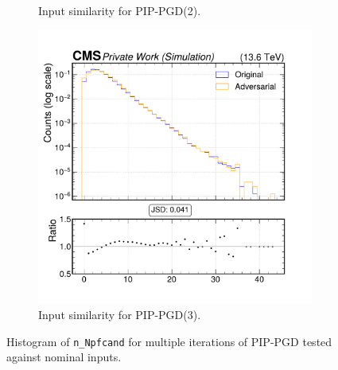 \begin{figure}[htbp]
\begin{subfigure}[t]{0.32\textwidth}
    \caption*{Input similarity for PIP-PGD(2).}
  \end{subfigure}\hfill
  \begin{subfigure}[t]{0.32\textwidth}
    \includegraphics[width=\linewidth]{media/output/features/compare/combined_it_3/cmp_global_features_n_Npfcand.pdf}
    \caption*{Input similarity for PIP-PGD(3).}
  \end{subfigure}

  \caption*{Histogram of \texttt{n\_Npfcand} for multiple iterations of PIP-PGD tested against nominal inputs.}
  \label{fig:combined_input_n_Npfcand}
\end{figure}

